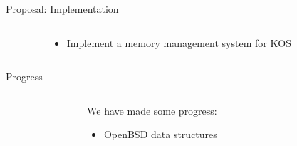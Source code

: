 \documentclass[aspectratio=169]{beamer}
\newcommand{\bi}{\begin{itemize}}
\newcommand{\ei}{\end{itemize}}
\begin{document}
\begin{frame}{Proposal: Implementation}
  \begin{columns}[T]
    \begin{column}{0.2\textwidth}
    \end{column}
    \begin{column}{0.6\textwidth}
      \bi
      \pause
    \item Implement a memory management system for KOS
      \ei
    \end{column}
    \begin{column}{0.2\textwidth}
    \end{column}
  \end{columns}
\end{frame}

\begin{frame}{Progress}
  \begin{columns}[T]
    \begin{column}{0.2\textwidth}
    \end{column}
    \begin{column}{0.6\textwidth}
      We have made some progress:
      \bi
    \item OpenBSD data structures
      \ei
    \end{column}
    \begin{column}{0.2\textwidth}
    \end{column}
  \end{columns}
\end{frame}
\end{document}
